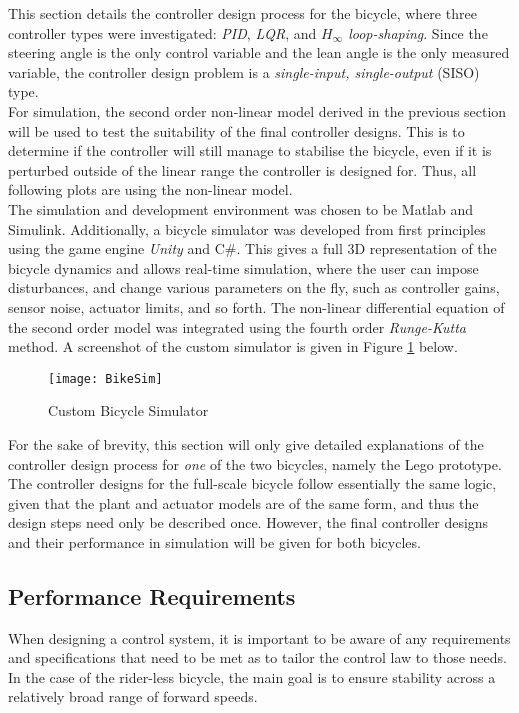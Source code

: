 This section details the controller design process for the bicycle, where three controller types were investigated: \textit{PID}, \textit{LQR}, and \textit{$H_{\infty}$ loop-shaping}. Since the steering angle is the only control variable and the lean angle is the only measured variable, the controller design problem is a \textit{single-input, single-output} (SISO) type. \\

For simulation, the second order non-linear model derived in the previous section will be used to test the suitability of the final controller designs. This is to determine if the controller will still manage to stabilise the bicycle, even if it is perturbed outside of the linear range the controller is designed for. Thus, all following plots are using the non-linear model. \\

The simulation and development environment was chosen to be Matlab and Simulink. Additionally, a bicycle simulator was developed from first principles using the game engine \textit{Unity} and C\#. This gives a full 3D representation of the bicycle dynamics and allows real-time simulation, where the user can impose disturbances, and change various parameters on the fly, such as controller gains, sensor noise, actuator limits, and so forth. The  non-linear differential equation of the second order model was integrated using the fourth order \textit{Runge-Kutta} method. A screenshot of the custom simulator is given in Figure \ref{fig:bikesim} below.

\begin{figure}[H]
	\centering
	\texttt{[image: BikeSim]}
	\caption{Custom Bicycle Simulator}
	\label{fig:bikesim}
\end{figure}

For the sake of brevity, this section will only give detailed explanations of the controller design process for \textit{one} of the two bicycles, namely the Lego prototype. The controller designs for the full-scale bicycle follow essentially the same logic, given that the plant and actuator models are of the same form, and thus the design steps need only be described once. However, the final controller designs and their performance in simulation will be given for both bicycles.

\subsection{Performance Requirements}
When designing a control system, it is important to be aware of any requirements and specifications that need to be met as to tailor the control law to those needs. In the case of the rider-less bicycle, the main goal is to ensure stability across a relatively broad range of forward speeds.\\

